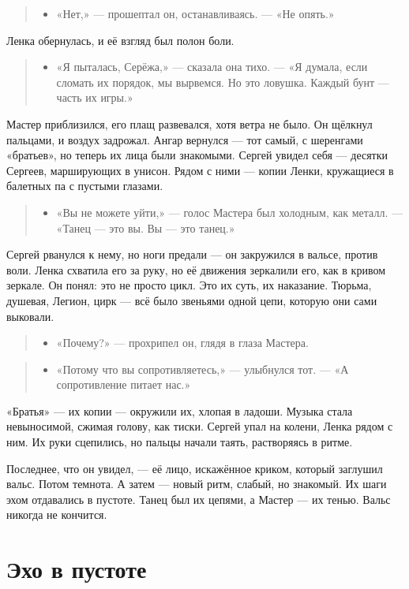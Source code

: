 \documentclass[12pt,a4paper]{book}
\newenvironment{dialogue}{\begin{quote}\itshape\begin{itemize}\item[]}{\end{itemize}\end{quote}}
\begin{document}
\begin{dialogue}
«Нет,» --- прошептал он, останавливаясь. --- «Не опять.»
\end{dialogue}

Ленка обернулась, и её взгляд был полон боли.

\begin{dialogue}
«Я пыталась, Серёжа,» --- сказала она тихо. --- «Я думала, если сломать их порядок, мы вырвемся. Но это ловушка. Каждый бунт — часть их игры.»
\end{dialogue}

Мастер приблизился, его плащ развевался, хотя ветра не было. Он щёлкнул пальцами, и воздух задрожал. Ангар вернулся --- тот самый, с шеренгами «братьев», но теперь их лица были знакомыми. Сергей увидел себя --- десятки Сергеев, марширующих в унисон. Рядом с ними --- копии Ленки, кружащиеся в балетных па с пустыми глазами.

\begin{dialogue}
«Вы не можете уйти,» --- голос Мастера был холодным, как металл. --- «Танец — это вы. Вы — это танец.»
\end{dialogue}

Сергей рванулся к нему, но ноги предали --- он закружился в вальсе, против воли. Ленка схватила его за руку, но её движения зеркалили его, как в кривом зеркале. Он понял: это не просто цикл. Это их суть, их наказание. Тюрьма, душевая, Легион, цирк --- всё было звеньями одной цепи, которую они сами выковали.

\begin{dialogue}
«Почему?» --- прохрипел он, глядя в глаза Мастера.
\end{dialogue}

\begin{dialogue}
«Потому что вы сопротивляетесь,» --- улыбнулся тот. --- «А сопротивление питает нас.»
\end{dialogue}

«Братья» --- их копии --- окружили их, хлопая в ладоши. Музыка стала невыносимой, сжимая голову, как тиски. Сергей упал на колени, Ленка рядом с ним. Их руки сцепились, но пальцы начали таять, растворяясь в ритме.

Последнее, что он увидел, --- её лицо, искажённое криком, который заглушил вальс. Потом темнота. А затем --- новый ритм, слабый, но знакомый. Их шаги эхом отдавались в пустоте. Танец был их цепями, а Мастер --- их тенью. Вальс никогда не кончится.

\section{Эхо в пустоте}
\end{document}
